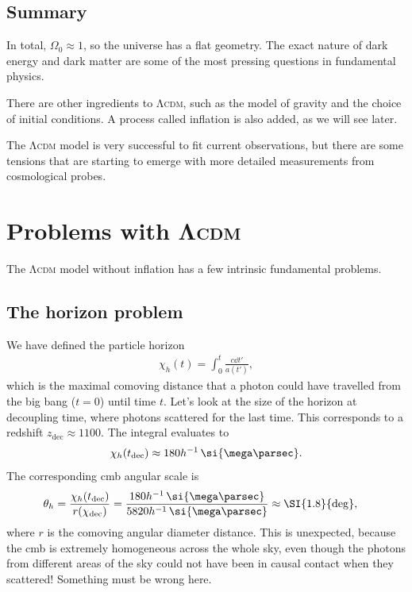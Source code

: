 \subsection*{Summary}
In total, $\Omega_0 \approx 1$, so the universe has a flat geometry. The exact nature of dark energy and dark matter are some of the most pressing questions in fundamental physics.

There are other ingredients to \textsc{Λcdm}, such as the model of gravity and the choice of initial conditions. A process called inflation is also added, as we will see later.

The \textsc{Λcdm} model is very successful to fit current observations, but there are some tensions that are starting to emerge with more detailed measurements from cosmological probes.



\section{Problems with \textsc{Λcdm}}

The \textsc{Λcdm} model without inflation has a few intrinsic fundamental problems.

\subsection{The horizon problem}
We have defined the particle horizon
\begin{align*}
	\chi_h(t) = \int_0^t \frac{c \dd{t'}}{a(t')},
\end{align*}
which is the maximal comoving distance that a photon could have travelled from the big bang ($t=0$) until time $t$. Let's look at the size of the horizon at decoupling time, where photons scattered for the last time. This corresponds to a redshift $z_\text{dec} \approx 1100$. The integral evaluates to
\begin{align*}
	\chi_h (t_\text{dec}) \approx 180 h^{-1} \, \si{\mega\parsec}.
\end{align*}
The corresponding \ac{cmb} angular scale is
\begin{align*}
	\theta_h
	&= \frac{\chi_h(t_\text{dec})}{r(\chi_\text{dec})} = \frac{180 h^{-1} \, \si{\mega\parsec}}{5820 h^{-1} \, \si{\mega\parsec}}
	\approx \SI{1.8}{\deg},
\end{align*}
where $r$ is the comoving angular diameter distance.
This is unexpected, because the \ac{cmb} is extremely homogeneous across the whole sky, even though the photons from different areas of the sky could not have been in causal contact when they scattered! Something must be wrong here.


